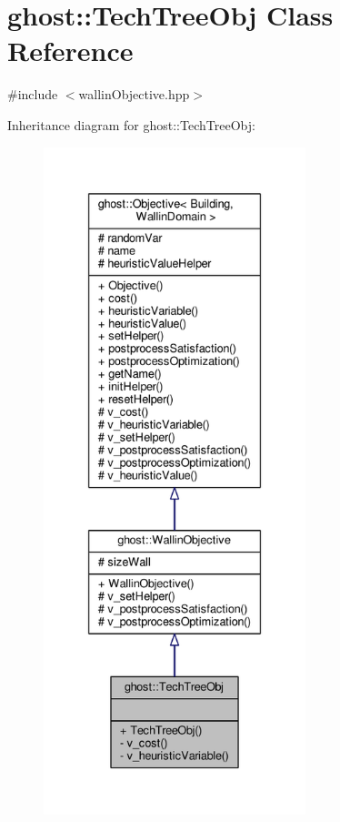 \hypertarget{classghost_1_1TechTreeObj}{\section{ghost\-:\-:Tech\-Tree\-Obj Class Reference}
\label{classghost_1_1TechTreeObj}
}


{\ttfamily \#include $<$wallin\-Objective.\-hpp$>$}



Inheritance diagram for ghost\-:\-:Tech\-Tree\-Obj\-:
\nopagebreak
\begin{figure}[H]
\begin{center}
\leavevmode
\includegraphics[height=550pt]{classghost_1_1TechTreeObj__inherit__graph}
\end{center}
\end{figure}


